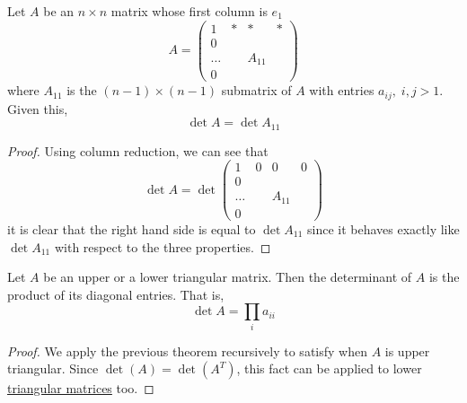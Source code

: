   \begin{theorem}
    \label{thm:determinant-via-the-first-column}
    Let $A$ be an $n \times n$ matrix whose first column is $e_1$
    \begin{equation}
      A = \begin{pmatrix}
      1&*&*&* \\
      0 &&& \\
      \ldots& & A_{11}& \\
      0&&&
      \end{pmatrix}
    \end{equation}
    where $A_{11}$ is the $(n-1) \times (n-1)$ submatrix of $A$ with entries $a_{i j}, \; i, j > 1$. Given this, 
    \begin{equation}
      \det{A} = \det{A_{11}}
    \end{equation}
  \end{theorem}
  \begin{proof}
    Using column reduction, we can see that 
    \begin{equation}
      \det{A} = \det{\begin{pmatrix}
      1&0&0&0 \\
      0 &&& \\
      \ldots& & A_{11}& \\
      0&&&
      \end{pmatrix}}
    \end{equation}
    it is clear that the right hand side is equal to $\det{A_{11}}$ since it behaves exactly like $\det{A_{11}}$ with respect to the three properties. 
  \end{proof}

  \begin{corollary}
    \label{thm:determinant-of-a-triangular-matrix}
    Let $A$ be an upper or a lower triangular matrix. Then the determinant of $A$ is the product of its diagonal entries. That is,  
    \begin{equation}
      \det{A} = \prod_{i} a_{i i}
    \end{equation}
  \end{corollary}
  \begin{proof}
    We apply the previous theorem recursively to satisfy when $A$ is upper triangular. Since $\det{(A)} = \det{(A^T)}$, this fact can be applied to lower \hyperref[def:triangular-matrices]{triangular matrices} too. 
  \end{proof}

